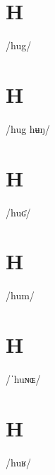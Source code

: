 \documentclass[10pt,a4paper,twoside]{book}
\begin{document}
\section*{H}

\begin{multicols}{3}
 {/hug/} {}
\end{multicols}

\section*{H}

\begin{multicols}{3}
 {/hug hʉŋ/} {}
\end{multicols}

\section*{H}

\begin{multicols}{3}
 {/huʛ/} {}
\end{multicols}

\section*{H}

\begin{multicols}{3}
 {/hum/} {}
\end{multicols}

\section*{H}

\begin{multicols}{3}
 {/ˈhuɴɶ/} {}
\end{multicols}

\section*{H}

\begin{multicols}{3}
 {/huʁ/} {}
\end{multicols}
\end{document}
